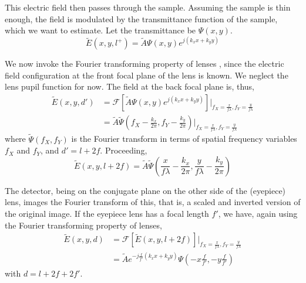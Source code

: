 \documentclass[11pt,a4paper,journal]{IEEEtran}
\begin{document}
This electric field then passes through the sample. Assuming the sample is thin enough, the field is modulated by the transmittance function of the sample, which we want to estimate. Let the transmittance be $\Psi (x, y)$.
\begin{equation}
\tilde{E}(x, y, l^+) = \tilde{A} \Psi (x, y) e^{j(k_x x + k_y y)}
\end{equation}

We now invoke the Fourier transforming property of lenses \cite[p.~104]{Goodman}, since the electric field configuration at the front focal plane of the lens is known. We neglect the lens pupil function for now. The field at the back focal plane is, thus, 
\begin{equation}
\begin{split}
\tilde{E}(x, y, d') &= \mathcal{F}[\tilde{A} \Psi (x, y) e^{j(k_x x + k_y y)}] \bigg|_{f_X=\frac{x}{f\lambda}, f_Y=\frac{y}{f\lambda}} \\
					  &= \tilde{A} \tilde{\Psi}\left(f_X - \frac{k_x}{2\pi}, f_Y - \frac{k_y}{2\pi}\right) \bigg|_{f_X=\frac{x}{f\lambda}, f_Y=\frac{y}{f\lambda}}
\end{split}
\end{equation}
where $\tilde{\Psi}(f_X, f_Y)$ is the Fourier transform in terms of spatial frequency variables $f_X$ and $f_Y$, and $d'=l+2f$. Proceeding, 
\begin{equation}
\tilde{E}(x, y, l+2f) = \tilde{A} \tilde{\Psi}\left(\frac{x}{f\lambda} - \frac{k_x}{2\pi}, \frac{y}{f\lambda} - \frac{k_y}{2\pi}\right)
\end{equation}

The detector, being on the conjugate plane on the other side of the (eyepiece) lens, images the Fourier transform of this, that is, a scaled and inverted version of the original image. If the eyepiece lens has a focal length $f'$, we have, again using the Fourier transforming property of lenses,
\begin{equation}
\begin{split}
\tilde{E}(x, y, d) &= \mathcal{F}[\tilde{E}(x, y, l+2f)] \bigg|_{f_X=\frac{x}{f\lambda}, f_Y=\frac{y}{f\lambda}} \\
&= \tilde{A} e^{-j\frac{f}{f'}\left(k_x x + k_y y\right)} \Psi\left(-x\frac{f}{f'}, -y\frac{f}{f'}\right)
\end{split}
\end{equation}
with $d=l+2f+2f'$.
\end{document}
